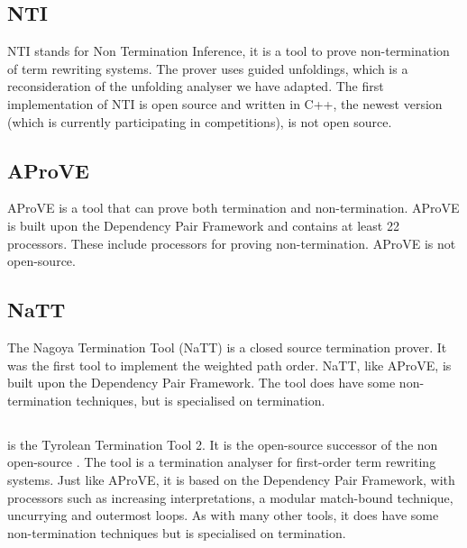 \subsection{NTI}
NTI\cite{payet2018guided} stands for Non Termination Inference, it is a tool to prove non-termination of term rewriting systems. The prover uses guided unfoldings, which is a reconsideration of the unfolding analyser we have adapted\cite{Payet:Unfolding}. The first implementation of NTI is open source and written in C++, the newest version (which is currently participating in competitions), is not open source\cite{PAYET:NTI}.

\subsection{AProVE}
AProVE\cite{10.1007/11814771_24} is a tool that can prove both termination and non-termination. AProVE is built upon the Dependency Pair Framework and contains at least 22 processors. These include processors for proving non-termination\cite{GIESL:APROVE}. AProVE is not open-source. 

\subsection{NaTT}
The Nagoya Termination Tool (NaTT) is a closed source termination prover\cite{Yamada2014NagoyaTT}. It was the first tool to implement the weighted path order\cite{Yamada2014NagoyaTT}. NaTT, like AProVE, is built upon the Dependency Pair Framework. The tool does have some non-termination techniques, but is specialised on termination.

\subsection{\TTTT}
\TTTT is the Tyrolean Termination Tool 2\cite{TTTT}. It is the open-source successor of the non open-source \TTT \cite{HIROKAWA2007474}. The tool is a termination analyser for first-order term rewriting systems. Just like AProVE, it is based on the Dependency Pair Framework, with processors such as increasing interpretations, a modular match-bound technique, uncurrying and outermost loops\cite{TTTT}. As with many other tools, it does have some non-termination techniques but is specialised on termination.

